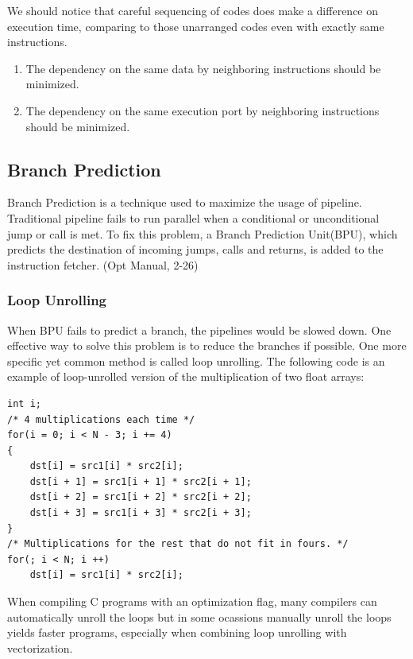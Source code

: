 \documentclass[a4paper]{report}
\begin{document}
	We should notice that careful sequencing of codes does make a difference on execution time, comparing to those unarranged codes even with exactly same instructions.
	
	\begin{enumerate}
	
	\item The dependency on the same data by neighboring instructions should be minimized.
	
	\item The dependency on the same execution port by neighboring instructions should be minimized.

	\end{enumerate}
\subsection{Branch Prediction} \indent

	Branch Prediction is a technique used to maximize the usage of pipeline. Traditional pipeline fails to run parallel when a conditional or unconditional jump or call is met. To fix this problem, a Branch Prediction Unit(BPU), which predicts the destination of incoming jumps, calls and returns, is added to the instruction fetcher. (Opt Manual, 2-26)
	
\subsubsection{Loop Unrolling} \indent
	
	When BPU fails to predict a branch, the pipelines would be slowed down. One effective way to solve this problem is to reduce the branches if possible. One more specific yet common method is called loop unrolling. The following code is an example of loop-unrolled version of the multiplication of two float arrays:
	
        \lstset{language = c, tabsize = 4}
        \begin{lstlisting}
int i;
/* 4 multiplications each time */
for(i = 0; i < N - 3; i += 4)
{
	dst[i] = src1[i] * src2[i];
	dst[i + 1] = src1[i + 1] * src2[i + 1];
	dst[i + 2] = src1[i + 2] * src2[i + 2];
	dst[i + 3] = src1[i + 3] * src2[i + 3];
}
/* Multiplications for the rest that do not fit in fours. */
for(; i < N; i ++)
	dst[i] = src1[i] * src2[i];
        \end{lstlisting}

	When compiling C programs with an optimization flag, many compilers can automatically unroll the loops but in some ocassions manually unroll the loops yields faster programs, especially when combining loop unrolling with vectorization.
\end{document}
